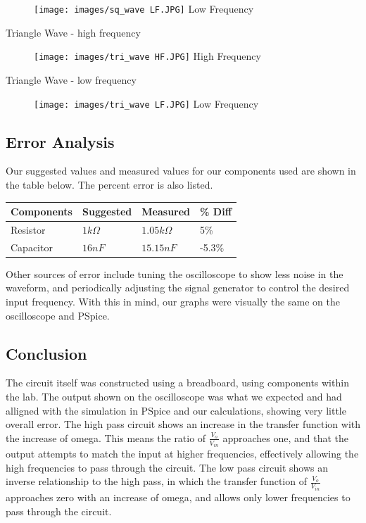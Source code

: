 \documentclass[11pt]{article}
\begin{document}
	\begin{figure}[H]
		\centering
		\texttt{[image: images/sq\_wave LF.JPG]}
		Low Frequency
	\end{figure}
	\newpage
	Triangle Wave - high frequency
	\begin{figure}[H]
		\centering
		\texttt{[image: images/tri\_wave HF.JPG]}
		High Frequency
	\end{figure}
	Triangle Wave - low frequency
	
	\begin{figure}[H]
		\centering
		\texttt{[image: images/tri\_wave LF.JPG]}
		Low Frequency
	\end{figure}
	
	\subsection*{Error Analysis}
	Our suggested values and measured values for our components used are shown in the table below. The percent error is also listed.
		\begin{table}[H]
		\def\arraystretch{1.2}%
		\centering
		\begin{tabular}{|l|l|l|l|}
			
			\hline
			Components       	& Suggested 		& Measured      	&\% Diff	\\ \hline
			Resistor  	    	& $1 k\Omega$		& $1.05 k\Omega$   & 5\%	     \\ \hline	
			Capacitor			& $16 n F$			& $15.15 nF$		& -5.3\%		\\ \hline
		\end{tabular}
	\end{table}
	Other sources of error include tuning the oscilloscope to show less noise in the waveform, and periodically adjusting the signal generator to control the desired input frequency. With this in mind, our graphs were visually the same on the oscilloscope and PSpice.
	\subsection*{Conclusion}
	The circuit itself was constructed using a breadboard, using components within the lab. The output shown on the oscilloscope was what we expected and had alligned with the simulation in PSpice and our calculations, showing very little overall error. 
	The high pass circuit shows an increase in the transfer function with the increase of omega. This means the ratio of $\frac{V_{o}}{V_{in}}$ approaches one, and that the output attempts to match the input at higher frequencies, effectively allowing the high frequencies to pass through the circuit. 
	The low pass circuit shows an inverse relationship to the high pass, in which the transfer function of $\frac{V_{o}}{V_{in}}$ approaches zero with an increase of omega, and allows only lower frequencies to pass through the circuit. 
	\newpage
\end{document}
